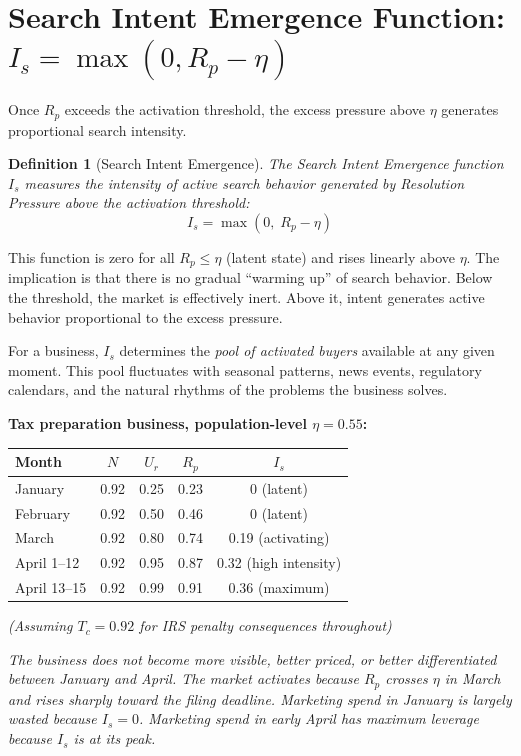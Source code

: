 \documentclass[12pt, openany]{book}
\theoremstyle{thmstyle}
\theoremstyle{defstyle}
\newtheorem{definition}{Definition}[chapter]
\begin{document}
\section{Search Intent Emergence Function: $I_s = \max(0, R_p - \eta)$}

Once $R_p$ exceeds the activation threshold, the excess pressure above $\eta$ generates proportional search intensity.

\begin{definition}[Search Intent Emergence]
The Search Intent Emergence function $I_s$ measures the intensity of active search behavior generated by Resolution Pressure above the activation threshold:
\begin{equation}
I_s = \max(0,\; R_p - \eta)
\label{eq:search_emergence}
\end{equation}
\end{definition}

This function is zero for all $R_p \leq \eta$ (latent state) and rises linearly above $\eta$. The implication is that there is no gradual ``warming up'' of search behavior. Below the threshold, the market is effectively inert. Above it, intent generates active behavior proportional to the excess pressure.

For a business, $I_s$ determines the \textit{pool of activated buyers} available at any given moment. This pool fluctuates with seasonal patterns, news events, regulatory calendars, and the natural rhythms of the problems the business solves.

\begin{examplebox}
\textbf{Tax preparation business, population-level $\eta = 0.55$:}

\begin{center}
\begin{tabular}{lcccc}
\toprule
\textbf{Month} & \textbf{$N$} & \textbf{$U_r$} & \textbf{$R_p$} & \textbf{$I_s$} \\
\midrule
January & 0.92 & 0.25 & 0.23 & 0 (latent) \\
February & 0.92 & 0.50 & 0.46 & 0 (latent) \\
March & 0.92 & 0.80 & 0.74 & 0.19 (activating) \\
April 1--12 & 0.92 & 0.95 & 0.87 & 0.32 (high intensity) \\
April 13--15 & 0.92 & 0.99 & 0.91 & 0.36 (maximum) \\
\bottomrule
\end{tabular}
\end{center}

\textit{(Assuming $T_c = 0.92$ for IRS penalty consequences throughout)}

\textit{The business does not become more visible, better priced, or better differentiated between January and April. The market activates because $R_p$ crosses $\eta$ in March and rises sharply toward the filing deadline. Marketing spend in January is largely wasted because $I_s = 0$. Marketing spend in early April has maximum leverage because $I_s$ is at its peak.}
\end{examplebox}
\end{document}
